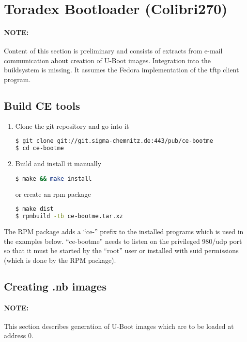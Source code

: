 \section{Toradex Bootloader (Colibri270)}

\paragraph{NOTE:} Content of this section is preliminary and consists
of extracts from e-mail communication about creation of U-Boot images.
Integration into the buildsystem is missing.  It assumes the Fedora
implementation of the tftp client program.

\subsection{Build CE tools}

\begin{enumerate}
\item Clone the git repository and go into it
\begin{lstlisting}[language=sh]
$ git clone git://git.sigma-chemnitz.de:443/pub/ce-bootme
$ cd ce-bootme
\end{lstlisting}
\item Build and install it manually
\begin{lstlisting}[language=sh]
$ make && make install
\end{lstlisting}%
or create an rpm package
\begin{lstlisting}[language=sh]
$ make dist
$ rpmbuild -tb ce-bootme.tar.xz
\end{lstlisting}
\end{enumerate}

The RPM package adds a ``ce-'' prefix to the installed programs which
is used in the examples below. ``ce-bootme'' needs to listen on the
privileged 980/udp port so that it must be started by the ``root''
user or installed with suid permissions (which is done by the RPM
package).

\subsection{Creating .nb images}

\paragraph{NOTE:} This section describes generation of U-Boot images
which are to be loaded at address 0.

